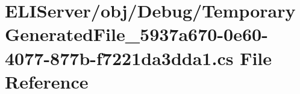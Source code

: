 \hypertarget{_e_l_i_server_2_e_l_i_server_2obj_2_debug_2_temporary_generated_file__5937a670-0e60-4077-877b-f7221da3dda1_8cs}{}\section{E\+L\+I\+Server/obj/\+Debug/\+Temporary\+Generated\+File\+\_\+5937a670-\/0e60-\/4077-\/877b-\/f7221da3dda1.cs File Reference}
\label{_e_l_i_server_2_e_l_i_server_2obj_2_debug_2_temporary_generated_file__5937a670-0e60-4077-877b-f7221da3dda1_8cs}
